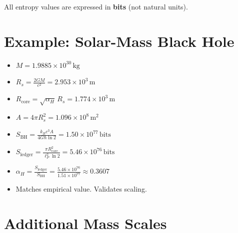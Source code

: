 \documentclass[a4paper, 12pt, oneside]{book}
\numberwithin{equation}{chapter}
\begin{document}
All entropy values are expressed in \textbf{bits} (not natural units).

\section{Example: Solar-Mass Black Hole}
\label{sec:SolarMass}

\begin{itemize}
  \item \( M = 1.9885 \times 10^{30} \,\mathrm{kg} \)
  \item \( R_s = \frac{2GM}{c^2} = 2.953 \times 10^3 \,\mathrm{m} \)
  \item \( R_{\text{core}} = \sqrt{\alpha_H}\,R_s = 1.774 \times 10^3 \,\mathrm{m} \)
  \item \( A = 4\pi R_s^2 = 1.096 \times 10^8 \,\mathrm{m^2} \)
  \item \( S_{\text{BH}} = \frac{k_B c^3 A}{4 G \hbar \ln 2} = 1.50 \times 10^{77} \,\text{bits} \)
  \item \( S_{\text{ledger}} = \frac{\pi R_{\text{core}}^2}{\ell_P^2 \ln 2} = 5.46 \times 10^{76} \,\text{bits} \)
  \item \( \alpha_H = \frac{S_{\text{ledger}}}{S_{\text{BH}}} = \frac{5.46 \times 10^{76}}{1.51 \times 10^{77}} \approx 0.3607 \)
\end{itemize}

\begin{itemize}
  \item {} Matches empirical value. Validates scaling.
\end{itemize}

\section{Additional Mass Scales}
\label{sec:AdditionalMasses}
\end{document}
